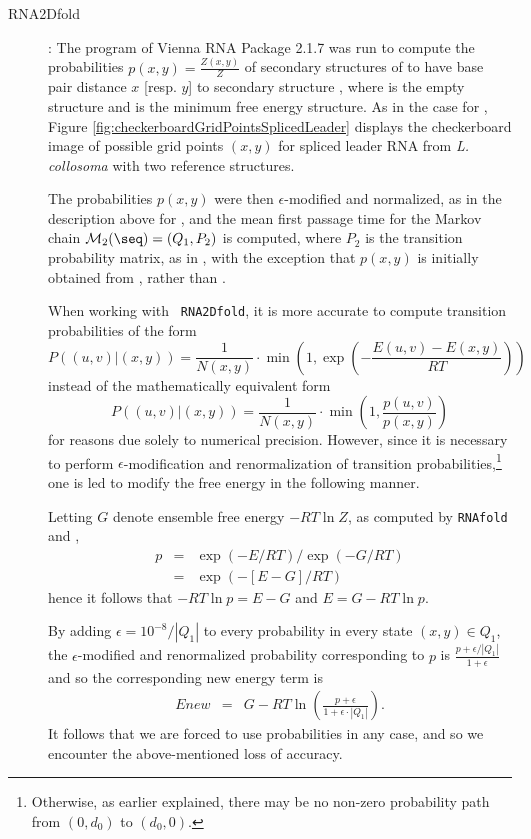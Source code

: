 \begin{description}
\item[RNA2Dfold]: The program \rnatwofold of Vienna RNA Package
2.1.7 was run to compute the probabilities $p(x,y) = \frac{Z(x,y)}{Z}$
of secondary structures of \seq to have base pair distance $x$
[resp. $y$] to secondary structure , where \strA is the
empty structure and \strB is the minimum free energy structure. As in
the case for \ffttwo,
Figure \ref{fig:checkerboardGridPointsSplicedLeader} displays the
checkerboard image of possible grid points $(x,y)$ for spliced leader
RNA from {\em L. collosoma} with two reference structures.

The probabilities $p(x,y)$ were then $\epsilon$-modified and
normalized, as in the description above for \ffteq, and the mean
first passage time for the Markov chain $\mathcal{M}_2(\seq) =
(Q_1,P_2)$ is computed, where $P_2$ is the transition probability
matrix, as in \ffttwo, with the exception that $p(x,y)$ is
initially obtained from \rnatwofold, rather than \ffttwo.

When working with {\tt
RNA2Dfold}, it is more accurate to compute transition probabilities of
the form $$ P( (u,v) | (x,y) ) = \frac{1}{N(x,y)} \cdot \min(1,
\exp(-\frac{E(u,v)-E(x,y)}{RT})) $$ instead of the mathematically
equivalent form $$ P( (u,v) | (x,y) ) = \frac{1}{N(x,y)} \cdot \min(1,
\frac{p(u,v)}{p(x,y)}) $$ for reasons due solely to numerical
precision. However, since it is necessary to perform
$\epsilon$-modification and renormalization of transition
probabilities,\footnote{Otherwise, as earlier explained, there may be
no non-zero probability path from $(0,d_0)$ to $(d_0,0)$.} one is led
to modify the free energy in the following manner.

Letting $G$ denote ensemble free energy $-RT \ln Z$, as computed by
{\tt RNAfold} and \rnatwofold,
\begin{align*}
p &=& \exp(-E/RT)/\exp(-G/RT) \\
&=& \exp(-[ E-G] /RT)
\end{align*}
hence it follows that $-RT \ln p = E-G$ and $E = G-RT \ln p$.

By adding $\epsilon=10^{-8}/|Q_1|$ to every probability in every state
$(x,y) \in Q_1$, the $\epsilon$-modified and renormalized probability
corresponding to $p$ is $\frac{p+\epsilon/|Q_1|}{1+ \epsilon}$ and so
the corresponding new energy term is
\begin{align}
\label{eq:modifiedEnergyTerm} Enew &=& G- RT \ln( \frac{p+\epsilon}{1
+ \epsilon \cdot |Q_1|} ).
\end{align}
It follows that we are forced to use probabilities in any case, and so
we encounter the above-mentioned loss of accuracy.


\end{description}
